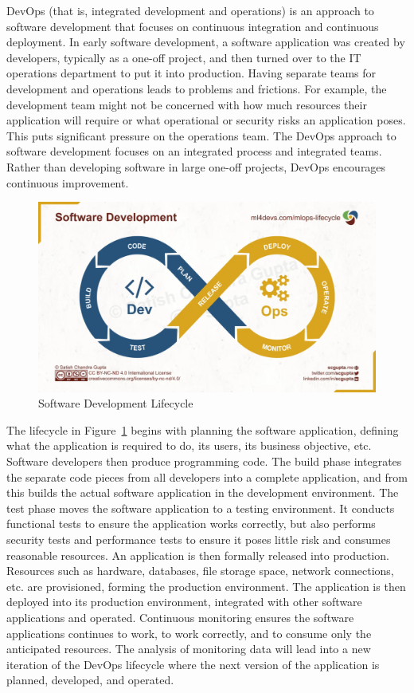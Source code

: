 DevOps (that is, integrated development and operations) is an approach to software development that focuses on continuous integration and continuous deployment. In early software development, a software application was created by developers, typically as a one-off project, and then turned over to the IT operations department to put it into production. Having separate teams for development and operations leads to problems and frictions. For example, the development team might not be concerned with how much resources their application will require or what operational or security risks an application poses. This puts significant pressure on the operations team. The DevOps approach to software development focuses on an integrated process and integrated teams. Rather than developing software in large one-off projects, DevOps encourages continuous improvement. 

\begin{figure}[h]
\centering
\includegraphics[width=.8\textwidth]{devopsmodel.jpeg}
\caption{Software Development Lifecycle}
\label{fig:devopsmodel}
\end{figure}

The lifecycle in Figure~\ref{fig:devopsmodel} begins with planning the software application, defining what the application is required to do, its users, its business objective, etc. Software developers then produce programming code. The build phase integrates the separate code pieces from all developers into a complete application, and from this builds the actual software application in the development environment. The test phase moves the software application to a testing environment. It conducts functional tests to ensure the application works correctly, but also performs security tests and performance tests to ensure it poses little risk and consumes reasonable resources. An application is then formally released into production. Resources such as hardware, databases, file storage space, network connections, etc. are provisioned, forming the production environment. The application is then deployed into its production environment, integrated with other software applications and operated. Continuous monitoring ensures the software applications continues to work, to work correctly, and to consume only the anticipated resources. The analysis of monitoring data will lead into a new iteration of the DevOps lifecycle where the next version of the application is planned, developed, and operated.

